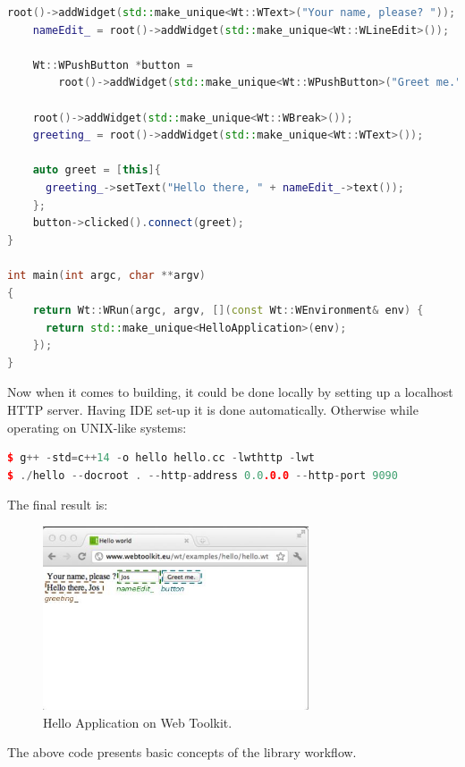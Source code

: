 \documentclass[a4paper,12pt]{book}
\begin{document}
{{\begin{lstlisting}[frame=single, basicstyle=\small, language=C++, caption={A complete "Hello world" application \cite{helloworldapp}.}, captionpos=b]
    root()->addWidget(std::make_unique<Wt::WText>("Your name, please? "));
    nameEdit_ = root()->addWidget(std::make_unique<Wt::WLineEdit>());
    
    Wt::WPushButton *button = 
    	root()->addWidget(std::make_unique<Wt::WPushButton>("Greet me."));
    	
    root()->addWidget(std::make_unique<Wt::WBreak>());
    greeting_ = root()->addWidget(std::make_unique<Wt::WText>());
    
    auto greet = [this]{
      greeting_->setText("Hello there, " + nameEdit_->text());
    };
    button->clicked().connect(greet);
}

int main(int argc, char **argv)
{
    return Wt::WRun(argc, argv, [](const Wt::WEnvironment& env) {
      return std::make_unique<HelloApplication>(env);
    });
}
\end{lstlisting}

\newpage
Now when it comes to building, it could be done locally by setting up a localhost HTTP server. Having IDE set-up it is done automatically. Otherwise while operating on UNIX-like systems:

\begin{lstlisting}[frame=single, basicstyle=\small, language=C++, caption={Building "Hello world" application.}, captionpos=b]
$ g++ -std=c++14 -o hello hello.cc -lwthttp -lwt
$ ./hello --docroot . --http-address 0.0.0.0 --http-port 9090
\end{lstlisting}

\bigskip
The final result is:
\begin{figure}[h]
  \centering
    \includegraphics[width=0.7\textwidth]{hello-app}
    \caption{Hello Application on Web Toolkit.}
\end{figure}

\bigskip
The above code presents basic concepts of the library workflow.

}}
\end{document}
